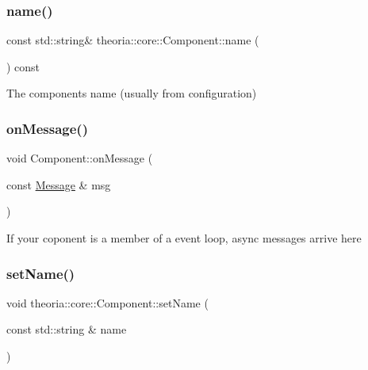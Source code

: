 \subsubsection{\texorpdfstring{name()}{name()}}
{\footnotesize\ttfamily const std\+::string\& theoria\+::core\+::\+Component\+::name (\begin{DoxyParamCaption}{ }\end{DoxyParamCaption}) const\hspace{0.3cm}{\ttfamily [inline]}}

The component\textquotesingle{}s name (usually from configuration) \mbox{\label{classtheoria_1_1core_1_1Component_a6b6d003ecdddc3eee401917f01ae7a1d}} 
\subsubsection{\texorpdfstring{on\+Message()}{onMessage()}}
{\footnotesize\ttfamily void Component\+::on\+Message (\begin{DoxyParamCaption}\item[{const \hyperlink{classtheoria_1_1core_1_1Message}{Message} \&}]{msg }\end{DoxyParamCaption})\hspace{0.3cm}{\ttfamily [virtual]}}

If your coponent is a member of a event loop, async messages arrive here \mbox{\label{classtheoria_1_1core_1_1Component_a4c741f3d65b7d50bd56378bdc9cc9a62}} 
\subsubsection{\texorpdfstring{set\+Name()}{setName()}}
{\footnotesize\ttfamily void theoria\+::core\+::\+Component\+::set\+Name (\begin{DoxyParamCaption}\item[{const std\+::string \&}]{name }\end{DoxyParamCaption})\hspace{0.3cm}{\ttfamily [inline]}}

